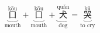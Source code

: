 \[ \underbrace{\overset{\text{kǒu}}{\text{口}}}_{\text{mouth}} + \underbrace{\overset{\text{kǒu}}{\text{口}}}_{\text{mouth}} + \underbrace{\overset{\text{quǎn}}{\text{犬}}}_{\text{dog}} = \underbrace{\overset{\text{kū}}{\text{哭}}}_{\text{to cry}} \]
